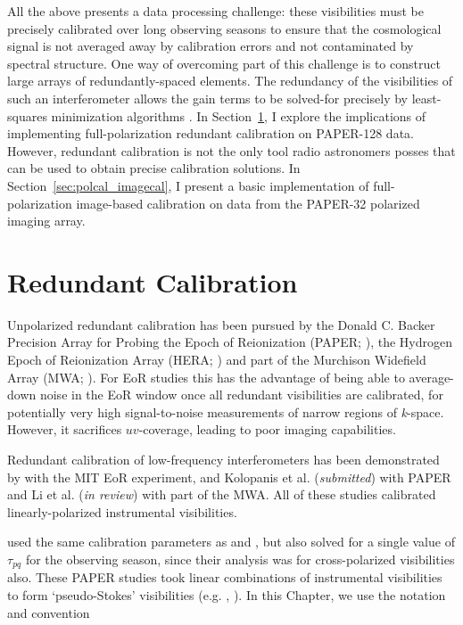 All the above presents a data processing challenge: these visibilities must be precisely calibrated over long observing seasons to ensure that the cosmological signal is not averaged away by calibration errors and not contaminated by spectral structure. One way of overcoming part of this challenge is to construct large arrays of redundantly-spaced elements. The redundancy of the visibilities of such an interferometer allows the gain terms to be solved-for precisely by least-squares minimization algorithms \citep{Liu.10}. In Section~\ref{sec:polcal_redcal}, I explore the implications of implementing full-polarization redundant calibration on PAPER-128 data. However, redundant calibration is not the only tool radio astronomers posses that can be used to obtain precise calibration solutions. In Section~\ref{sec:polcal_imagecal}, I present a basic implementation of full-polarization image-based calibration on data from the PAPER-32 polarized imaging array.

\section{Redundant Calibration}
\label{sec:polcal_redcal}

Unpolarized redundant calibration has been pursued by the Donald C. Backer Precision Array for Probing the Epoch of Reionization (PAPER; \citet{Parsons.10}), the Hydrogen Epoch of Reionization Array (HERA; \citet{deBoer.17}) and part of the Murchison Widefield Array (MWA; \citet{Tingay.13}). For EoR studies this has the advantage of being able to average-down noise in the EoR window once all redundant visibilities are calibrated, for potentially very high signal-to-noise measurements of narrow regions of \textit{k}-space. However, it sacrifices $uv$-coverage, leading to poor imaging capabilities.

Redundant calibration of low-frequency interferometers has been demonstrated by \citet{Zheng.14} with the MIT EoR experiment, \citet{Parsons.14, Jacobs.15, Ali.15} and Kolopanis et al. (\textit{submitted}) with PAPER and Li et al. (\textit{in review}) with part of the MWA. All of these studies calibrated linearly-polarized instrumental visibilities. 

\citet{Moore.17} used the same calibration parameters as \citet{Parsons.14} and \citet{Jacobs.15}, but also solved for a single value of $\tau_{pq}$ for the observing season, since their analysis was for cross-polarized visibilities also. These PAPER studies took linear combinations of instrumental visibilities to form `pseudo-Stokes' visibilities (e.g. \citet{TMS}, \citet{Moore.13}). In this Chapter, we use the notation and convention

